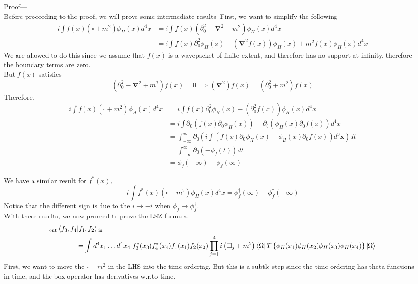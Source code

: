 \documentclass[11pt, notitlepage]{report}
\newcommand{\del}{\partial}
\numberwithin{equation}{section}
\begin{document}
\underline{Proof}—\\
Before proceeding to the proof, we will prove some intermediate results. First, we want to simplify the following
\begin{align*}
    i\int f(x) (\square + m^2) \phi_H(x) d^4x &= i\int f(x) \left(\del_0^2 - \mathbf{\nabla}^2 + m^2\right)\phi_H(x) d^4x\\
    &=i\int f(x) \del_0^2\phi_H(x) - \left(\mathbf{\nabla}^2 f(x)\right) \phi_H(x) + m^2f(x)\phi_H(x)d^4x
\end{align*}
We are allowed to do this since we assume that \(f(x)\) is a wavepacket of finite extent, and therefore has no support at infinity, therefore the boundary terms are zero.\\
But \(f(x)\) satisfies
\begin{equation*}
    \left(\del_0^2 - \mathbf{\nabla}^2 +m^2\right)f(x) = 0 \implies \left(\mathbf{\nabla}^2 \right)f(x) = (\del_0^2 + m^2)f(x)
\end{equation*}
Therefore, 
\begin{align*}
    i\int f(x) (\square + m^2) \phi_H(x) d^4x &= i\int f(x) \del_0^2\phi_H(x) - \left(\del_0^2 f(x)\right) \phi_H(x)d^4x\\
    &=i\int \del_0\left(f(x) \del_0\phi_H(x)\right) - \del_0\left(\phi_H(x)\del_0 f(x)\right) d^4x\\
    &=\int_{-\infty}^{\infty}\del_0\left(i\int \left(f(x) \del_0\phi_H(x)- \phi_H(x)\del_0 f(x)\right) d^3\textbf{x}\right)dt\\
    &= \int_{-\infty}^{\infty} \del_0\left(- \phi_f(t)\right) dt\\
    &= \phi_f(-\infty) - \phi_f(\infty)
\end{align*}

We have a similar result for \(f^*(x)\),
\begin{equation*}
    i\int f^*(x) (\square + m^2) \phi_H(x) d^4x = \phi_f^\dagger(\infty) - \phi_f^\dagger(-\infty)
\end{equation*}
Notice that the different sign is due to the \(i\to -i\) when \(\phi_f\to \phi^\dagger_f\).\\

With these results, we now proceed to prove the LSZ formula. 
\begin{align*}
    &{}_{\text{out}}\braket{f_3, f_4|f_1, f_2}{}_{\text{in}} \\
    &~~~~~~~~~~~~= \int d^4x_1 \ldots d^4x_4 ~f_3^*(x_3)f_4^*(x_4)f_1(x_1)f_2(x_2) \prod_{j=1}^4i\left(\square_j + m^2 \right) \bra{\Omega}T\left\{ \phi_H(x_1)\phi_H(x_2)\phi_H(x_3)\phi_H(x_4) \right\}\ket{\Omega}
\end{align*}
First, we want to move the \(\square + m^2\) in the LHS into the time ordering. But this is a subtle step since the time ordering has theta functions in time, and the box operator has derivatives w.r.to time.\\
\end{document}
